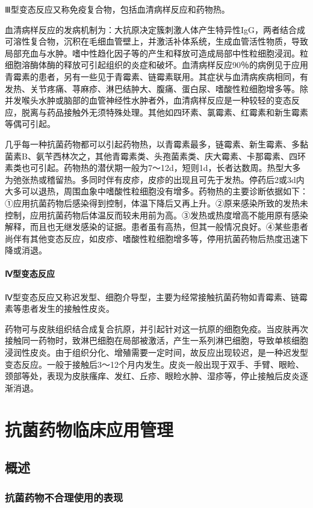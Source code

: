 Ⅲ型变态反应又称免疫复合物，包括血清病样反应和药物热。

血清病样反应的发病机制为：大抗原决定簇刺激人体产生特异性IgG，两者结合成可溶性复合物，沉积在毛细血管壁上，并激活补体系统，生成血管活性物质，导致局部充血与水肿。嗜中性趋化因子等的产生和释放可造成局部中性粒细胞浸润。粒细胞溶酶体酶的释放可引起组织的炎症和破坏。血清病样反应90％的病例见于应用青霉素的患者，另有一些见于青霉素、链霉素联用。其症状与血清病疾病相同，有发热、关节疼痛、荨麻疹、淋巴结肿大、腹痛、蛋白尿、嗜酸性粒细胞增多等。除并发喉头水肿或脑部的血管神经性水肿者外，血清病样反应是一种较轻的变态反应，脱离与药品接触外无须特殊处理。其他如四环素、氯霉素、红霉素和新生霉素等偶可引起。

几乎每一种抗菌药物都可以引起药物热，以青霉素最多，链霉素、新生霉素、多黏菌素B、氨苄西林次之，其他青霉素类、头孢菌素类、庆大霉素、卡那霉素、四环素类也可引起。药物热的潜伏期一般为7～12d，短则1d，长者达数周。热型大多为弛张热或稽留热。多同时伴有皮疹，皮疹的出现且可先于发热。停药后2或3d内大多可以退热，周围血象中嗜酸性粒细胞没有增多。药物热的主要诊断依据如下：①应用抗菌药物后感染得到控制，体温下降后又再上升。②原来感染所致的发热未控制，应用抗菌药物后体温反而较未用前为高。③发热或热度增高不能用原有感染解释，而且也无继发感染的证据。患者虽有高热，但其一般情况良好。④某些患者尚伴有其他变态反应，如皮疹、嗜酸性粒细胞增多等，停用抗菌药物后热度迅速下降或消退。
\paragraph{Ⅳ型变态反应}

Ⅳ型变态反应又称迟发型、细胞介导型，主要为经常接触抗菌药物如青霉素、链霉素等患者发生的接触性皮炎。

药物可与皮肤组织结合成复合抗原，并引起针对这一抗原的细胞免疫。当皮肤再次接触同一药物时，致淋巴细胞在局部被激活，产生一系列淋巴细胞，导致单核细胞浸润性皮炎。由于组织分化、增殖需要一定时间，故反应出现较迟，是一种迟发型变态反应。一般于接触后3～12个月内发生。皮炎一般出现于双手、手臂、眼睑、颈部等处，表现为皮肤瘙痒、发红、丘疹、眼睑水肿、湿疹等，停止接触后皮炎逐渐消退。

\section{抗菌药物临床应用管理}

\subsection{概述}

\subsubsection{抗菌药物不合理使用的表现}


